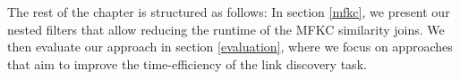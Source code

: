 The rest of the chapter is structured as follows: 
In section \ref{mfkc}, we present our nested filters that allow reducing the runtime of the MFKC similarity joins. We then evaluate our approach in section \ref{evaluation}, where we focus on approaches that aim to improve the time-efficiency of the link discovery task. 





